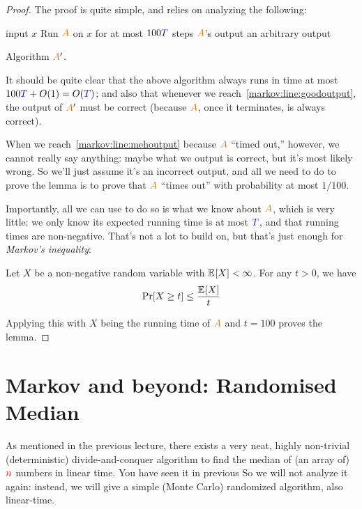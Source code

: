 \begin{proof}
The proof is quite simple, and relies on analyzing the following:
\begin{algorithm}[H]
\begin{algorithmic}[1]
    \Require input $x$
    \State Run $\Algo$ on $x$ for at most $100\textcolor{blue}{T}$ steps
        \State\label{markov:line:goodoutput}\Return $\Algo$'s output 
    \Else 
        \State\label{markov:line:mehoutput}\Return an arbitrary output 
    \EndIf
\end{algorithmic}
    \caption{Algorithm $\Algo'$.}
\end{algorithm}
It should be quite clear that the above algorithm always runs in time at most $100\textcolor{blue}{T} + O(1) = O(\textcolor{blue}{T})$; and also that whenever we reach~\cref{markov:line:goodoutput}, the output of $\Algo'$ must be correct (because $\Algo$, once it terminates, is always correct). 

When we reach~\cref{markov:line:mehoutput} because $\Algo$ ``timed out,'' however, we cannot really say anything: maybe what we output is correct, but it's most likely wrong. So we'll just assume it's an incorrect output, and all we need to do to prove the lemma is to prove that $\Algo$ ``times out'' with probability at most $1/100$.

Importantly, all we can use to do so is what we know about $\Algo$, which is very little: we only know its expected running time is at most $\textcolor{blue}{T}$, and that running times are non-negative. That's not a lot to build on, but that's just enough for \emph{Markov's inequality}:

\begin{theorem}
Let $X$ be a non-negative random variable with $\bEE{X} < \infty$. For any $t > 0$, we have
\[  
  \bPr{ X \geq t } \leq \frac{\bEE{X}}{t}
\]
\end{theorem}
\noindent Applying this with $X$ being the running time of $\Algo$ and $t=100$ proves the lemma.
\end{proof}
\section{Markov and beyond: Randomised Median}
As mentioned in the previous lecture, there exists a very neat, highly non-trivial (deterministic) divide-and-conquer algorithm to find the median of (an array of) ${\textcolor{red}{n}}$ numbers in linear time. You have seen it in previous  So we will not analyze it again: instead, we will give a simple (Monte Carlo) randomized algorithm, also linear-time. 

